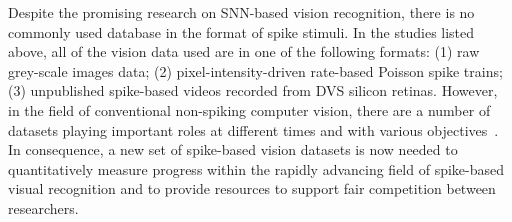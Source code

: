 Despite the promising research on SNN-based vision recognition, there is no commonly used database in the format of spike stimuli.
In the studies listed above, all of the vision data used are in one of the following formats:
(1) raw grey-scale images data;
(2) pixel-intensity-driven rate-based Poisson spike trains;
(3) unpublished spike-based videos recorded from DVS silicon retinas.
However, in the field of conventional non-spiking computer vision, there are a number of datasets playing important roles at different times and with various objectives~\cite{lecun1998gradient,deng2009imagenet,blank2005actions,liu2009recognizing}.
In consequence, a new set of spike-based vision datasets is now needed to quantitatively measure progress within the rapidly advancing field of spike-based visual recognition and to provide resources to support fair competition between researchers.

